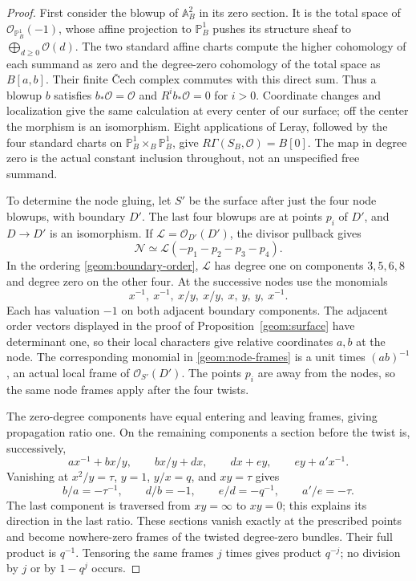 \begin{proof}
First consider the blowup of $\mathbb A^2_B$ in its zero section.
It is the total space of $\mathcal O_{\mathbb P^1_B}(-1)$, whose
affine projection to $\mathbb P^1_B$ pushes its structure sheaf to
$\bigoplus_{d\geq0}\mathcal O(d)$.  The two standard affine charts
compute the higher cohomology of each summand as zero and the
degree-zero cohomology of the total space as $B[a,b]$.  Their finite
\v Cech complex commutes with this direct sum.  Thus a blowup
$b$ satisfies $b_*\mathcal O=\mathcal O$ and
$R^ib_*\mathcal O=0$ for $i>0$.  Coordinate changes and localization
give the same calculation at every center of our surface; off the
center the morphism is an isomorphism.  Eight applications of Leray,
followed by the four standard charts on
$\mathbb P^1_B\times_B\mathbb P^1_B$, give
$R\Gamma(S_B,\mathcal O)=B[0]$.  The map in degree zero is the actual
constant inclusion throughout, not an unspecified free summand.

To determine the node gluing, let $S'$ be the surface after just the
four node blowups, with boundary $D'$.  The last four blowups are at
points $p_i$ of $D'$, and $D\to D'$ is an isomorphism.  If
$\mathcal L=\mathcal O_{D'}(D')$, the divisor pullback gives
\[
\mathcal N\simeq\mathcal L(-p_1-p_2-p_3-p_4).
\]
In the ordering \eqref{geom:boundary-order}, $\mathcal L$ has degree
one on components $3,5,6,8$ and degree zero on the other four.
At the successive nodes use the monomials
\begin{equation}
x^{-1},\ x^{-1},\ x/y,\ x/y,\ x,\ y,\ y,\ x^{-1}.
\label{geom:node-frames}
\end{equation}
Each has valuation $-1$ on both adjacent boundary components.
The adjacent order vectors displayed in the proof of
Proposition~\ref{geom:surface} have determinant one, so their local
characters give relative coordinates $a,b$ at the node.  The
corresponding monomial in \eqref{geom:node-frames} is a unit times
$(ab)^{-1}$, an actual local frame of $\mathcal O_{S'}(D')$.
The points $p_i$ are away from the nodes, so the same node frames
apply after the four twists.

The zero-degree components have equal entering and leaving frames,
giving propagation ratio one.  On the remaining components a section
before the twist is, successively,
\[
a x^{-1}+b x/y,\qquad b x/y+d x,\qquad d x+e y,\qquad
e y+a' x^{-1}.
\]
Vanishing at $x^2/y=\tau$, $y=1$, $y/x=q$, and $xy=\tau$ gives
\[
b/a=-\tau^{-1},\qquad d/b=-1,\qquad e/d=-q^{-1},\qquad a'/e=-\tau.
\]
The last component is traversed from $xy=\infty$ to $xy=0$;
this explains its direction in the last ratio.  These sections
vanish exactly at the prescribed points and become nowhere-zero
frames of the twisted degree-zero bundles.  Their full product is
$q^{-1}$.  Tensoring the same frames $j$ times gives product $q^{-j}$;
no division by $j$ or by $1-q^j$ occurs.


\end{proof}
